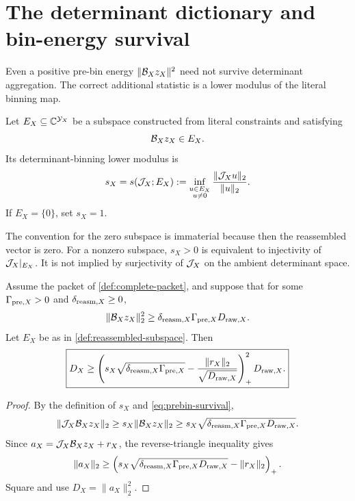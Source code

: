 \section{The determinant dictionary and bin-energy survival}
\label{sec:dictionary}

Even a positive pre-bin energy
\(\|\mathcal B_Xz_X\|^2\) need not survive determinant aggregation.
The correct additional statistic is a lower modulus of the literal
binning map.

\begin{definition}
\label{def:reassembled-subspace}
Let \(E_X\subseteq\mathbb C^{\mathcal Y_X}\) be a subspace constructed from literal
constraints and satisfying
\[
 \mathcal B_Xz_X\in E_X.
\]
Its determinant-binning lower modulus is
\begin{equation}
 s_X=s(\mathcal J_X;E_X)
 :=
 \inf_{\substack{u\in E_X\\u\ne0}}
 \frac{\|\mathcal J_Xu\|_2}{\|u\|_2}.
 \label{eq:lower-modulus}
\end{equation}
If \(E_X=\{0\}\), set \(s_X=1\).
\end{definition}

The convention for the zero subspace is immaterial because then the
reassembled vector is zero.  For a nonzero subspace,
\(s_X>0\) is equivalent to injectivity of
\(\mathcal J_X|_{E_X}\).  It is not implied by surjectivity of
\(\mathcal J_X\) on the ambient determinant space.

\begin{theorem}
\label{thm:dictionary-lower}
Assume the packet of \cref{def:complete-packet}, and suppose that for
some \(\Gamma_{{\rm pre},X}>0\) and
\(\delta_{{\rm reasm},X}\ge0\),
\begin{equation}
 \|\mathcal B_Xz_X\|_2^2
 \ge
 \delta_{{\rm reasm},X}\Gamma_{{\rm pre},X}
 D_{{\rm raw},X}.
 \label{eq:prebin-survival}
\end{equation}
Let \(E_X\) be as in \cref{def:reassembled-subspace}.  Then
\begin{equation}
 \boxed{\displaystyle
 D_X\ge
 \left(
 s_X\sqrt{\delta_{{\rm reasm},X}\Gamma_{{\rm pre},X}}
 -\frac{\|r_X\|_2}{\sqrt{D_{{\rm raw},X}}}
 \right)_+^2D_{{\rm raw},X}.}
 \label{eq:dictionary-lower}
\end{equation}
\end{theorem}

\begin{proof}
By the definition of \(s_X\) and
\eqref{eq:prebin-survival},
\[
 \|\mathcal J_X\mathcal B_Xz_X\|_2
 \ge s_X\|\mathcal B_Xz_X\|_2
 \ge
 s_X\sqrt{\delta_{{\rm reasm},X}\Gamma_{{\rm pre},X}
 D_{{\rm raw},X}}.
\]
Since \(a_X=\mathcal J_X\mathcal B_Xz_X+r_X\), the reverse-triangle
inequality gives
\[
 \|a_X\|_2
 \ge
 \left(
 s_X\sqrt{\delta_{{\rm reasm},X}\Gamma_{{\rm pre},X}
 D_{{\rm raw},X}}
 -\|r_X\|_2
 \right)_+.
\]
Square and use \(D_X=\|a_X\|_2^2\).
\end{proof}

